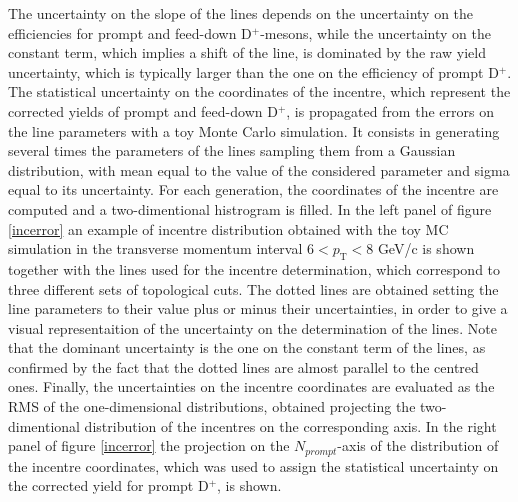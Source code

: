 \documentclass[b5paper,10pt,twoside,oldstyle,classica]{toptesi}
\newcommand{\pt}{p_\text{T}}
\begin{document}
The uncertainty on the slope of the lines depends on the uncertainty on the efficiencies for prompt and feed-down D$^+$-mesons, while the uncertainty on the constant term, which implies a shift of the line, is dominated by the raw yield uncertainty, which is typically larger than the one on the efficiency of prompt D$^+$. The statistical uncertainty on the coordinates of the incentre, which represent the corrected yields of prompt and feed-down D$^+$, is propagated from the errors on the line parameters with a toy Monte Carlo simulation. It consists in generating several times the parameters of the lines sampling them from a Gaussian distribution, with mean equal to the value of the considered parameter and sigma equal to its uncertainty. For each generation, the coordinates of the incentre are computed and a two-dimentional histrogram is filled. In the left panel of figure \ref{incerror} an example of incentre distribution obtained with the toy MC simulation in the transverse momentum interval $6<\pt<8$ GeV/c is shown together with the lines used for the incentre determination, which correspond to three different sets of topological cuts. The dotted lines are obtained setting the line parameters to their value plus or minus their uncertainties, in order to give a visual representaition of the uncertainty on the determination of the lines. Note that the dominant uncertainty is the one on the constant term of the lines, as confirmed by the fact that the dotted lines are almost parallel to the centred ones. Finally, the uncertainties on the incentre coordinates are evaluated as the RMS of the one-dimensional distributions, obtained projecting the two-dimentional distribution of the incentres on the corresponding axis. In the right panel of figure \ref{incerror} the projection on the $N_{prompt}$-axis of the distribution of the incentre coordinates, which was used to assign the statistical uncertainty on the corrected yield for prompt D$^+$, is shown.     
\end{document}
